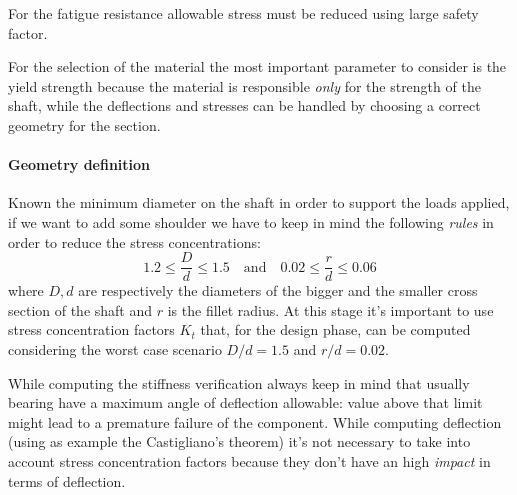 \begin{multicols}
	For the fatigue resistance allowable stress must be reduced using large safety factor. 
	
	For the selection of the material the most important parameter to consider is the yield strength because the material is responsible \textit{only} for the strength of the shaft, while the deflections and stresses can be handled by choosing a correct geometry for the section.
	
	\paragraph{Geometry definition} Known the minimum diameter on the shaft in order to support the loads applied, if we want to add some shoulder we have to keep in mind the following \textit{rules} in order to reduce the stress concentrations:
	\[ 1.2 \leq \frac D d \leq 1.5 \quad \textrm{and} \quad 0.02 \leq \frac r d\leq 0.06 \]
	where $D,d$ are respectively the diameters of the bigger and the smaller cross section of the shaft and $r$ is the fillet radius. At this stage it's important to use stress concentration factors $K_t$ that, for the design phase, can be computed considering the worst case scenario $D/d = 1.5$ and $r/d = 0.02$.

	While computing the stiffness verification always keep in mind that usually bearing have a maximum angle of deflection allowable: value above that limit might lead to a premature failure of the component. While computing deflection (using as example the Castigliano's theorem) it's not necessary to take into account stress concentration factors because they don't have an high \textit{impact} in terms of deflection.
	

\end{multicols}

